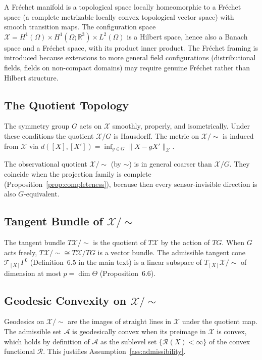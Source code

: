 \documentclass[12pt, oneside]{article}
\newcommand{\Xmod}{\mathcal{X}/{\sim}}
\begin{document}
A Fréchet manifold is a topological space locally homeomorphic to a Fréchet space (a
complete metrizable locally convex topological vector space) with smooth transition maps.
The configuration space $\mathcal{X} = H^1(\Omega) \times H^1(\Omega;\mathbb{R}^3) \times
L^2(\Omega)$ is a Hilbert space, hence also a Banach space and a Fréchet space, with its
product inner product. The Fréchet framing is introduced because extensions to more
general field configurations (distributional fields, fields on non-compact domains) may
require genuine Fréchet rather than Hilbert structure.

\subsection{The Quotient Topology}

The symmetry group $G$ acts on $\mathcal{X}$ smoothly, properly, and isometrically.
Under these conditions the quotient $\mathcal{X}/G$ is Hausdorff. The metric on $\Xmod$
is induced from $\mathcal{X}$ via $d([X],[X']) = \inf_{g \in G} \|X - gX'\|_{\mathcal{X}}$.

The observational quotient $\Xmod$ (by $\sim$) is in general coarser than $\mathcal{X}/G$.
They coincide when the projection family is complete (Proposition~\ref{prop:completeness}),
because then every sensor-invisible direction is also $G$-equivalent.

\subsection{Tangent Bundle of $\Xmod$}

The tangent bundle $T\Xmod$ is the quotient of $T\mathcal{X}$ by the action of $TG$. When
$G$ acts freely, $T\Xmod \cong T\mathcal{X}/TG$ is a vector bundle. The admissible tangent
cone $\mathcal{T}_{[X]}\Gamma^0$ (Definition~6.5 in the main text) is a linear subspace
of $T_{[X]}\Xmod$ of dimension at most $p = \dim\Theta$ (Proposition~6.6).

\subsection{Geodesic Convexity on $\Xmod$}

Geodesics on $\Xmod$ are the images of straight lines in $\mathcal{X}$ under the
quotient map. The admissible set $\mathcal{A}$ is geodesically convex when its preimage
in $\mathcal{X}$ is convex, which holds by definition of $\mathcal{A}$ as the
sublevel set $\{\mathcal{R}(X) < \infty\}$ of the convex functional $\mathcal{R}$.
This justifies Assumption~\ref{ass:admissibility}.
\end{document}
